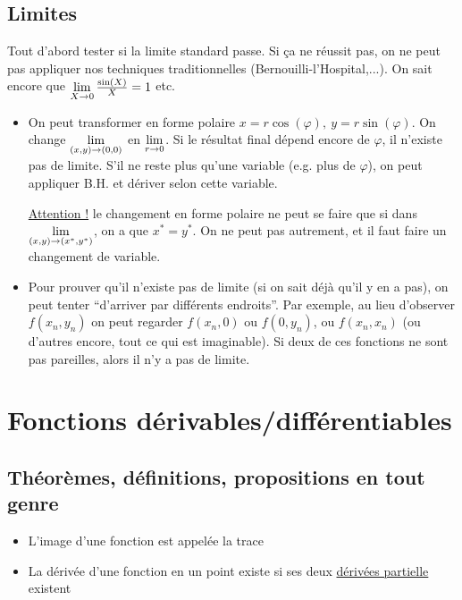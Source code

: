 \documentclass[12pt,a4paper]{article}
\renewcommand{\)}{\right)}
\renewcommand{\(}{\left(}
\begin{document}
\subsection{Limites}
Tout d'abord tester si la limite standard passe. Si ça ne réussit pas, on ne peut pas appliquer nos techniques traditionnelles (Bernouilli-l'Hospital,...). On sait encore que $\lim\limits_{X \to 0}\frac{\sin(X)}{X} = 1$ etc. 
\begin{itemize}
	\item	 {} On peut transformer en forme polaire $x = r\cos(\varphi),\ y = r\sin(\varphi)$. On change $\lim\limits_{(x,y) \to(0,0)}$ en $\lim\limits_{r\to 0}$. Si le résultat final dépend encore de $\varphi$, il n'existe pas de limite. S'il ne reste plus qu'une variable (e.g. plus de $\varphi$), on peut appliquer B.H. et dériver selon cette variable.

			\uline{Attention !} le changement en forme polaire ne peut se faire que si dans $\lim\limits_{(x,y) \to (x^*,y^*)}$, on a que $x^* = y^*$. On ne peut pas autrement, et il faut faire un changement de variable. 
	
	\item 	{} Pour prouver qu'il n'existe pas de limite (si on sait déjà qu'il y en a pas), on peut tenter \enquote{d'arriver par différents endroits}. Par exemple, au lieu d'observer $f(x_n,y_n)$ on peut regarder $f(x_n,0)$ ou $f(0,y_n)$, ou $f(x_n,x_n)$ (ou d'autres encore, tout ce qui est imaginable). Si deux de ces fonctions ne sont pas pareilles, alors il n'y a pas de limite.
\end{itemize}
\section[Fonctions dérivables/diff.]{Fonctions dérivables/différentiables}
\subsection{Théorèmes, définitions, propositions en tout genre}
\begin{multicols}{2}
	\begin{itemize}
		\item 	L'image d'une fonction est appelée la trace
		\item 	La dérivée d'une fonction en un point existe si ses deux \hyperref[deriv_partielle]{dérivées partielle} existent
	\end{itemize}
\end{multicols}
\end{document}
